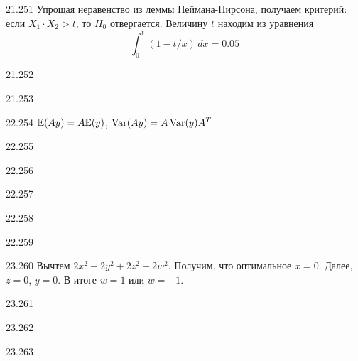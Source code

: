 \protect \hypertarget {soln:21.251}{}
\begin{solution}{{21.251}}
  Упрощая неравенство из леммы Неймана-Пирсона, получаем критерий: если $X_1\cdot X_2 >t$, то $H_0$ отвергается. Величину $t$ находим из уравнения
\[
\int_0^t (1 - t/x) \, dx = 0.05
\]
\end{solution}
\protect \hypertarget {soln:21.252}{}
\begin{solution}{{21.252}}

\end{solution}
\protect \hypertarget {soln:21.253}{}
\begin{solution}{{21.253}}
\end{solution}
\protect \hypertarget {soln:22.254}{}
\begin{solution}{{22.254}}
$\mathbb{E}(Ay)=A\mathbb{E}(y)$, $\operatorname{Var}(Ay)=A\operatorname{Var}(y)A^T$
\end{solution}
\protect \hypertarget {soln:22.255}{}
\begin{solution}{{22.255}}

\end{solution}
\protect \hypertarget {soln:22.256}{}
\begin{solution}{{22.256}}

\end{solution}
\protect \hypertarget {soln:22.257}{}
\begin{solution}{{22.257}}

\end{solution}
\protect \hypertarget {soln:22.258}{}
\begin{solution}{{22.258}}

\end{solution}
\protect \hypertarget {soln:22.259}{}
\begin{solution}{{22.259}}

\end{solution}
\protect \hypertarget {soln:23.260}{}
\begin{solution}{{23.260}}
Вычтем $2x^2 + 2y^2 + 2z^2 + 2w^2$. Получим, что оптимальное $x=0$. Далее, $z=0$, $y=0$. В итоге $w=1$ или $w=-1$.
\end{solution}
\protect \hypertarget {soln:23.261}{}
\begin{solution}{{23.261}}

\end{solution}
\protect \hypertarget {soln:23.262}{}
\begin{solution}{{23.262}}
\end{solution}
\protect \hypertarget {soln:23.263}{}
\begin{solution}{{23.263}}
\end{solution}
